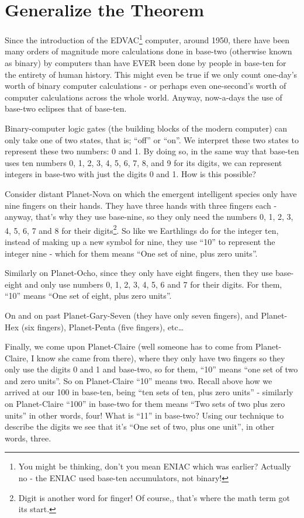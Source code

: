 \documentclass{article}
\begin{document}
\section*{Generalize the Theorem}

Since the introduction of the EDVAC\footnote{You might be thinking, don't you
mean ENIAC which was earlier? Actually no - the ENIAC
used base-ten accumulators, not binary!} computer, around 1950,
there have been many orders of magnitude more calculations done
in base-two (otherwise known as binary) by computers than have EVER
been done by people in base-ten for the entirety of human history.
This might even be true if we only count one-day's worth of
binary computer calculations - or perhaps even one-second's worth
of computer calculations across the whole world.
Anyway, now-a-days the use of base-two eclipses that of base-ten.

Binary-computer logic gates (the building blocks of the modern computer)
can only take one of two states, that is; ``off'' or ``on''.
We interpret these two states to represent these two numbers: 0 and 1.
By doing so, in the same way that base-ten uses ten numbers 0,
1, 2, 3, 4, 5, 6, 7, 8, and 9 for its digits, we can represent integers
in base-two with just the digits 0 and 1. How is this possible?

Consider distant Planet-Nova on which the emergent
intelligent species only have nine fingers on their hands.
They have three hands with three fingers each - anyway,
that's why they use base-nine, so they only need the numbers 0,
1, 2, 3, 4, 5, 6, 7 and 8 for their digits\footnote{Digit
is another word for finger! Of course,, that's where the math term got its start.}.
So like we Earthlings do for the integer ten,
instead of making up a new symbol for nine,
they use ``10'' to represent the integer nine - which
for them means ``One set of nine, plus zero units''.

Similarly on Planet-Ocho, since they only have eight fingers,
then they use base-eight and only use numbers 0, 1,
2, 3, 4, 5, 6 and 7 for their digits. For them, ``10''
means ``One set of eight, plus zero units''.

On and on past Planet-Gary-Seven (they have only seven fingers),
and Planet-Hex (six fingers), Planet-Penta (five fingers), etc\dots{}

Finally, we come upon Planet-Claire (well someone
has to come from Planet-Claire,
I know she came from there),
where they only have two fingers
so they only use the digits 0 and 1 and base-two,
so for them, ``10'' means ``one set of two and zero units''.
So on Planet-Claire ``10'' means two.
Recall above how we arrived at our 100 in base-ten,
being ``ten sets of ten,
plus zero units'' - similarly on Planet-Claire ``100''
in base-two for them means ``Two sets of two plus zero units'' in other words,
four! What is ``11'' in base-two? Using our technique to
describe the digits we see that it's ``One set of two, plus one unit'',
in other words, three.
\end{document}
